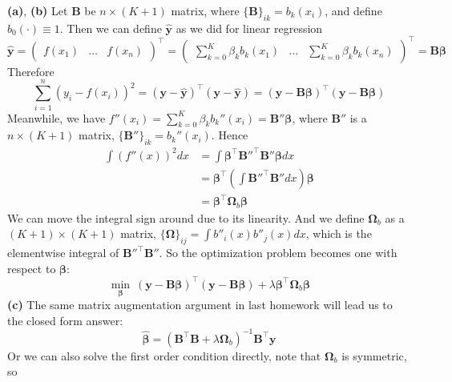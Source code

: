 \documentclass[11pt]{article}
\begin{document}
    \textbf{(a)}, \textbf{(b)} Let $\bm{B}$ be $n\times (K+1)$ matrix, where $\{\bm{B}\}_{ik} = b_k(x_i)$, and define $b_0(\cdot)\equiv 1$. Then we can define $\hat{\bm{y}}$ as we did for linear regression
\begin{equation}
    \hat{\bm{y}} = \begin{pmatrix}
        f(x_1) & \hdots &f(x_n)
    \end{pmatrix}^{\top} = \begin{pmatrix}
        \sum_{k=0}^{K}\beta_k b_k(x_1) & \hdots & \sum_{k=0}^{K}\beta_k b_k(x_n)
    \end{pmatrix}^{\top} = \bm{B\beta}
\end{equation}
Therefore
\begin{equation}
    \sum_{i=1}^n (y_i - f(x_i))^2 = (\bm{y}-\hat{\bm{y}})^{\top} (\bm{y}-\hat{\bm{y}}) = (\bm{y} - \bm{B\beta})^{\top} (\bm{y} - \bm{B\beta})
\end{equation}
Meanwhile, we have $f''(x_i) = \sum_{k=0}^{K}\beta_k b_k''(x_i) = \bm{B}''\bm{\beta}$, where $\bm{B}''$ is a $n\times (K+1)$ matrix, $\{\bm{B}''\}_{ik} = b_k''(x_i)$. Hence
\begin{equation}
    \begin{split}
        \int (f''(x))^2 dx &= \int \bm{\beta}^{\top}\bm{B}''^{\top} \bm{B}''\bm{\beta} dx \\
        &= \bm{\beta}^{\top} \left(\int \bm{B}''^{\top} \bm{B}'' dx\right) \bm{\beta} \\
        &= \bm{\beta}^{\top} \bm{\Omega}_{b} \bm{\beta}
    \end{split}
\end{equation}
We can move the integral sign around due to its linearity. And we define $\bm{\Omega}_b$ as a $(K+1)\times(K+1)$ matrix, $\{\bm{\Omega}\}_{ij} = \int b''_i(x) b''_j(x)dx$, which is the elementwise integral of $\bm{B}''^{\top} \bm{B}''$. So the optimization problem becomes one with respect to $\bm{\beta}$:
\begin{equation}
    \min\limits_{\bm{\beta}}~(\bm{y} - \bm{B\beta})^{\top} (\bm{y} - \bm{B\beta}) + \lambda \bm{\beta}^{\top} \bm{\Omega}_{b} \bm{\beta}
  \end{equation}  
\textbf{(c)} The same matrix augmentation argument in last homework will lead us to the closed form answer:
\begin{equation}
    \hat{\bm{\beta}} = ( \bm{B}^{\top} \bm{B} + \lambda \bm{\Omega}_b)^{-1} \bm{B}^{\top} \bm{y}
\end{equation}
Or we can also solve the first order condition directly, note that $\bm{\Omega}_b$ is symmetric, so 
\end{document}
